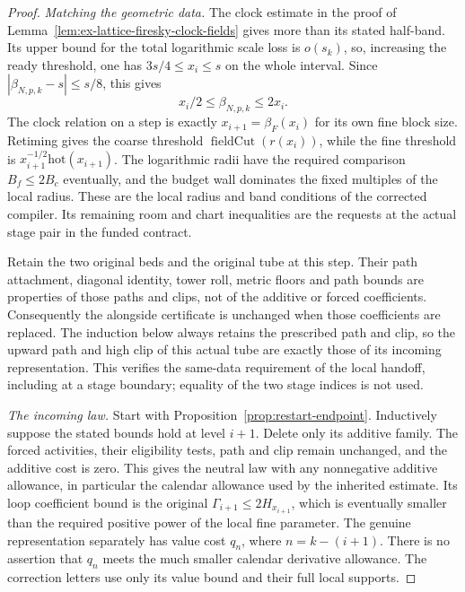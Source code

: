 \begin{proof}
\emph{Matching the geometric data.}
The clock estimate in the proof of
Lemma~\ref{lem:ex-lattice-firesky-clock-fields} gives more than its
stated half-band. Its upper bound for the total logarithmic scale loss
is $o(s_k)$, so, increasing the ready threshold, one has
$3s/4\le x_i\le s$ on the whole interval. Since
$|\beta_{N,p,k}-s|\le s/8$, this gives
\[
                 x_i/2\le\beta_{N,p,k}\le2x_i.
\]
The clock relation on a step is exactly
$x_{i+1}=\beta_F(x_i)$ for its own fine block size. Retiming gives
the coarse threshold $\operatorname{fieldCut}(r(x_i))$, while the fine
threshold is $x_{i+1}^{-1/2}\mathrm{hot}(x_{i+1})$. The logarithmic
radii have the required comparison $B_f\le2B_c$ eventually, and the
budget wall dominates the fixed multiples of the local radius.
These are the local radius and band conditions of the corrected
compiler. Its remaining room and chart inequalities are the requests
at the actual stage pair in the funded contract.

Retain the two original beds and the original tube at this step.
Their path attachment, diagonal identity, tower roll, metric floors
and path bounds are properties of those paths and clips, not of the
additive or forced coefficients. Consequently the alongside certificate
is unchanged when those coefficients are replaced. The induction below
always retains the prescribed path and clip, so the upward path and
high clip of this actual tube are exactly those of its incoming
representation. This verifies the same-data requirement of the local
handoff, including at a stage boundary; equality of the two stage
indices is not used.

\emph{The incoming law.}
Start with Proposition~\ref{prop:restart-endpoint}. Inductively suppose
the stated bounds hold at level $i+1$. Delete only its additive family.
The forced activities, their eligibility tests, path and clip remain
unchanged, and the additive cost is zero. This gives the neutral law
with any nonnegative additive allowance, in particular the calendar
allowance used by the inherited estimate. Its loop coefficient bound
is the original $\Gamma_{i+1}\le2H_{x_{i+1}}$, which is eventually
smaller than the required positive power of the local fine parameter.
The genuine representation separately has value cost $q_n$, where
$n=k-(i+1)$. There is no assertion that $q_n$ meets the much smaller
calendar derivative allowance. The correction letters use only its
value bound and their full local supports.


\end{proof}
